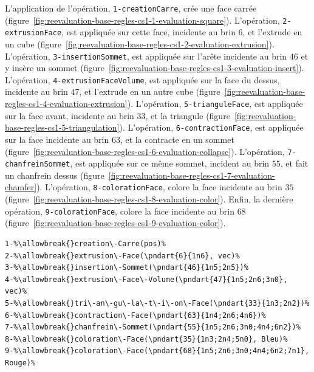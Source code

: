 L'application de l'opération, \texttt{1-\allowbreak{}creation\-Carre}, crée une face carrée
(figure~\ref{fig:reevaluation-base-regles-cs1-1-evaluation-square}). %
L'opération, \texttt{2-\allowbreak{}extrusion\-Face}, est appliquée sur cette face,
incidente au brin \(6\), et l'extrude en un cube
(figure~\ref{fig:reevaluation-base-regles-cs1-2-evaluation-extrusion}). %
L'opération, \texttt{3-\allowbreak{}insertion\-Sommet}, est appliquée sur l'arête incidente
au brin \(46\) et y insère un sommet
(figure~\ref{fig:reevaluation-base-regles-cs1-3-evaluation-insert}). %
L'opération, \texttt{4-\allowbreak{}extrusion\-Face\-Volume}, est appliquée sur la face
du dessus, incidente au brin \(47\), et l'extrude en un autre cube
(figure~\ref{fig:reevaluation-base-regles-cs1-4-evaluation-extrusion}). %
L'opération, \texttt{5-\allowbreak{}triangule\-Face}, est appliquée sur la face avant,
incidente au brin \(33\), et la triangule
(figure~\ref{fig:reevaluation-base-regles-cs1-5-triangulation}). %
L'opération, \texttt{6-\allowbreak{}contraction\-Face}, est appliquée sur la face
incidente au brin \(63\), et la contracte en un sommet
(figure~\ref{fig:reevaluation-base-regles-cs1-6-evaluation-collapse}). %
L'opération, \texttt{7-\allowbreak{}chanfrein\-Sommet}, est appliquée sur ce même sommet,
incident au brin \(55\), et fait un chanfrein dessus
(figure~\ref{fig:reevaluation-base-regles-cs1-7-evaluation-chamfer}). %
L'opération, \texttt{8-\allowbreak{}coloration\-Face}, colore la face incidente au brin
\(35\) (figure~\ref{fig:reevaluation-base-regles-cs1-8-evaluation-color}). %
Enfin, la dernière opération, \texttt{9-\allowbreak{}coloration\-Face}, colore la face incidente
au brin \(68\)
(figure~\ref{fig:reevaluation-base-regles-cs1-9-evaluation-color}). %

\begin{lstlisting}[escapechar=\%,
style=script-style,
caption=Spécification paramétrique initiale du cas nº~1,
label=lst:reevaluation-regles-specification-parametrique-init-cas-1,
captionpos=b]
1-%\allowbreak{}creation\-Carre(pos)%
2-%\allowbreak{}extrusion\-Face(\pndart{6}{1n6}, vec)%
3-%\allowbreak{}insertion\-Sommet(\pndart{46}{1n5;2n5})%
4-%\allowbreak{}extrusion\-Face\-Volume(\pndart{47}{1n5;2n6;3n0}, vec)%
5-%\allowbreak{}tri\-an\-gu\-la\-t\-i\-on\-Face(\pndart{33}{1n3;2n2})%
6-%\allowbreak{}contraction\-Face(\pndart{63}{1n4;2n6;4n6})%
7-%\allowbreak{}chanfrein\-Sommet(\pndart{55}{1n5;2n6;3n0;4n4;6n2})%
8-%\allowbreak{}coloration\-Face(\pndart{35}{1n3;2n4;5n0}, Bleu)%
9-%\allowbreak{}coloration\-Face(\pndart{68}{1n5;2n6;3n0;4n4;6n2;7n1}, Rouge)%
\end{lstlisting}

